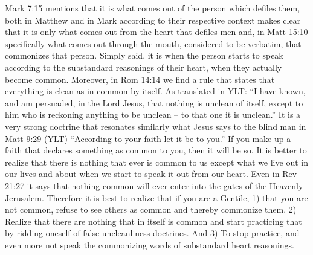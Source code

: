 Mark 7:15 mentions that it is what comes out of the person which defiles them, both in Matthew and in Mark according
to their respective context makes clear that it is only what comes out from the heart that defiles men and, in
Matt 15:10 specifically what comes out through the mouth, considered to be verbatim, that commonizes that person.
Simply said, it is when the person starts to speak according to the substandard reasonings of their heart, when
they actually become common.
Moreover, in Rom 14:14 we find a rule that states that everything is clean as in common by itself. As translated in YLT:
``I have known, and am persuaded, in the Lord Jesus, that nothing is unclean of itself, except to him who is reckoning
anything to be unclean -- to that one it is unclean.'' It is a very strong doctrine that resonates similarly what Jesus
says to the blind man in Matt 9:29 (YLT) ``According to your faith let it be to you.'' If you make up a faith that declares
something as common to you, then it will be so. It is better to realize that there is nothing that ever is common to us
except what we live out in our lives and about when we start to speak it out from our heart.
Even in Rev 21:27 it says that nothing common will ever enter into the gates of the Heavenly Jerusalem. Therefore it is
best to realize that if you are a Gentile, 1) that you are not common, refuse to see others as common and thereby
commonize them. 2) Realize that there are nothing that in itself is common and start practicing that by ridding oneself
of false uncleanliness doctrines. And 3) To stop practice, and even more not speak the commonizing words of substandard
heart reasonings.



